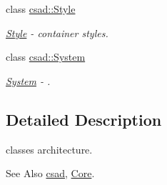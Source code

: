 \begin{DoxyCompactItemize}
class \hyperlink{classcsad_1_1_style}{csad\-::\-Style}
\begin{DoxyCompactList}\small\item\em \hyperlink{classcsad_1_1_style}{Style} -\/ container styles. \end{DoxyCompactList}\item 
class \hyperlink{classcsad_1_1_system}{csad\-::\-System}
\begin{DoxyCompactList}\small\item\em \hyperlink{classcsad_1_1_system}{System} -\/ . \end{DoxyCompactList}\end{DoxyCompactItemize}


\subsection{Detailed Description}
classes architecture. \begin{DoxySeeAlso}{See Also}
\hyperlink{namespacecsad}{csad}, \hyperlink{classcsad_1_1_core}{Core}. 
\end{DoxySeeAlso}
